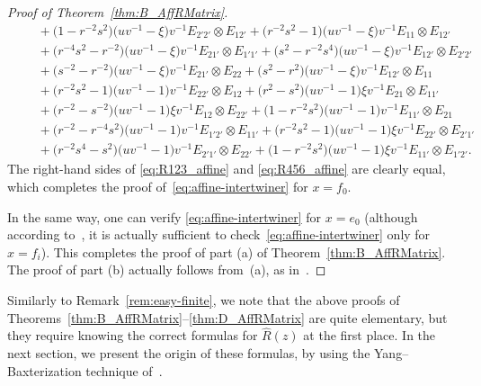 \documentclass[pdftex]{sigma}
\numberwithin{equation}{section}
\begin{document}
\begin{proof}[Proof of Theorem~\ref{thm:B_AffRMatrix}]
\begin{gather}
 \qquad{} + \bigl(1 - r^{-2}s^{2}\bigr)\bigl(uv^{-1} - \xi\bigr)v^{-1}E_{2'2'} \otimes E_{12'} + \bigl(r^{-2}s^{2} - 1\bigr)\bigl(uv^{-1} - \xi\bigr)v^{-1}E_{11} \otimes E_{12'} \nonumber\\
 \qquad{} + \bigl(r^{-4}s^{2} - r^{-2}\bigr)\bigl(uv^{-1} -\xi\bigr)v^{-1}E_{21'} \otimes E_{1'1'} + \bigl(s^{2} - r^{-2}s^{4}\bigr)\bigl(uv^{-1} - \xi\bigr)v^{-1}E_{12'} \otimes E_{2'2'} \nonumber\\
 \qquad{} + \bigl(s^{-2} - r^{-2}\bigr)\bigl(uv^{-1} - \xi\bigr)v^{-1}E_{21'} \otimes E_{22} + \bigl(s^{2} - r^{2}\bigr)\bigl(uv^{-1} - \xi\bigr)v^{-1}E_{12'} \otimes E_{11} \nonumber\\
 \qquad{} +\bigl(r^{-2}s^{2} - 1\bigr)\bigl(uv^{-1} - 1\bigr)v^{-1}E_{22'} \otimes E_{12} +\bigl(r^{2} - s^{2}\bigr)\bigl(uv^{-1} - 1\bigr)\xi v^{-1}E_{21} \otimes E_{11'} \nonumber\\
 \qquad{} + \bigl(r^{-2} - s^{-2}\bigr)\bigl(uv^{-1} - 1\bigr)\xi v^{-1}E_{12} \otimes E_{22'} + \bigl(1 - r^{-2}s^{2}\bigr)\bigl(uv^{-1} - 1\bigr)v^{-1}E_{11'} \otimes E_{21} \nonumber\\
 \qquad{} +\bigl(r^{-2} - r^{-4}s^{2}\bigr)\bigl(uv^{-1} - 1\bigr)v^{-1}E_{1'2'} \otimes E_{11'} + \bigl(r^{-2}s^{2} - 1\bigr)\bigl(uv^{-1} - 1\bigr)\xi v^{-1}E_{22'} \otimes E_{2'1'} \nonumber\\
 \qquad{} + \bigl(r^{-2}s^{4} - s^{2}\bigr)\bigl(uv^{-1} - 1\bigr)v^{-1}E_{2'1'} \otimes E_{22'} + \bigl(1 - r^{-2}s^{2}\bigr)\bigl(uv^{-1} - 1\bigr)\xi v^{-1}E_{11'} \otimes E_{1'2'}.\nonumber
\end{gather}
The right-hand sides of \eqref{eq:R123_affine} and \eqref{eq:R456_affine} are clearly equal, which completes the proof of~\eqref{eq:affine-intertwiner} for $x = f_{0}$.

In the same way, one can verify \eqref{eq:affine-intertwiner} for $x = e_{0}$ (although according to~\cite{Jim}, it is actually sufficient to check~\eqref{eq:affine-intertwiner} only for $x = f_{i}$). This completes the proof of part (a) of Theorem~\ref{thm:B_AffRMatrix}. The proof of part (b) actually follows from~(a), as in~\cite[Proposition~3]{Jim}.
\end{proof}

\begin{Remark}%
Similarly to Remark~\ref{rem:easy-finite}, we note that the above proofs of Theorems~\ref{thm:B_AffRMatrix}--\ref{thm:D_AffRMatrix} are quite elementary, but they require knowing the correct formulas for $\hat{R}(z)$ at the first place. In the next section, we present the origin of these formulas, by using the Yang--Baxterization technique of~\cite{GWX}.
\end{Remark}
\end{document}
